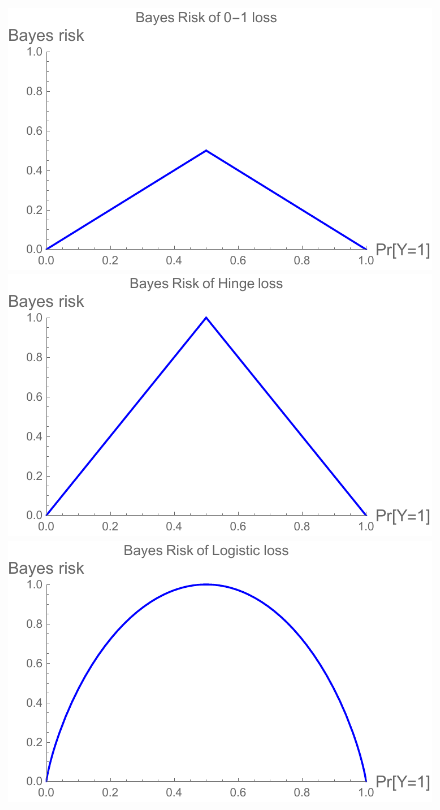 \documentclass[11pt]{article}
\begin{document}
\begin{figure}
	\begin{minipage}{0.3\linewidth}
	\centering
	\includegraphics[width=0.95\linewidth]{figs/0-1-br.pdf}
	\end{minipage}
	\hfill
	\begin{minipage}{0.3\linewidth}
	\centering		\includegraphics[width=0.95\linewidth]{figs/hinge-br.pdf}
	\end{minipage}
	\hfill
	\begin{minipage}{0.3\linewidth}
	\centering
	\includegraphics[width=0.95\linewidth]{figs/logistic-br.pdf}

\end{minipage}
\end{figure}
\end{document}
